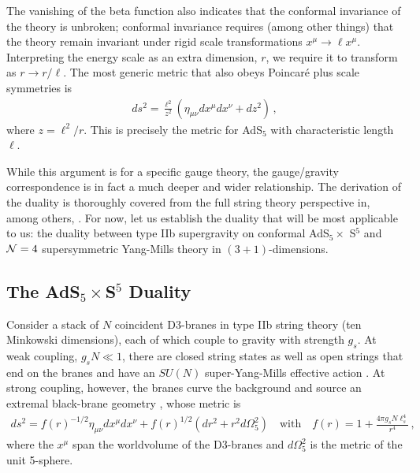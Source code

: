 \documentclass[../PhD.tex]{subfiles}
\begin{document}
The vanishing of the beta function also indicates that the conformal invariance of the theory is unbroken; conformal invariance requires (among other things) that the theory remain invariant under rigid scale transformations $x^\mu \to \ell x^\mu$. Interpreting the energy scale as an extra dimension, $r$, we require it to transform as $r \to r/ \ell$. The most generic metric that also obeys Poincar\'e plus scale symmetries is
\begin{align}
\label{Poincare ads}
ds^2 = \frac{\ell^2}{z^2} \left( \eta_{\mu \nu}dx^\mu dx^\nu +dz^2 \right) \, ,
\end{align}
where $z = \ell^2 / r$. This is precisely the metric for AdS$_5$ with characteristic length $\ell$. 

While this argument is for a specific gauge theory, the gauge/gravity correspondence is in fact a much deeper and wider relationship. The derivation of the duality is thoroughly covered from the full string theory perspective in, among others, \cite{hep-th/9711200, gr-qc/0602037, 1501.00007, hep-th/9902131, hep-th/9905111}. For now, let us establish the duality that will be most applicable to us: the duality between type IIb supergravity on conformal AdS$_5 \times$ S$^5$ and $\mathcal N = 4$ supersymmetric Yang-Mills theory in $(3+1)$-dimensions.


\subsection{The AdS$_5 \times$S$^5$ Duality}
\label{ssec: AdS5xS5}

Consider a stack of $N$ coincident D3-branes in type IIb string theory (ten Minkowski dimensions), each of which couple to gravity with strength $g_s$. At weak coupling, $g_s N \ll 1$, there are closed string states as well as open strings that end on the branes and have an $SU(N)$ super-Yang-Mills effective action \cite{Zwiebach:2004tj}. At strong coupling, however, the branes curve the background and source an extremal black-brane geometry \cite{Horowitz:1991cd}, whose metric is
\begin{align}
\label{bb geom}
ds^2 = f(r)^{-1/2} \eta_{\mu \nu} dx^\mu dx^\nu + f(r)^{1/2} \left(  dr^2 + r^2 d\Omega_5^2 \right)  \quad  \text{with} \quad f(r) = 1 + \frac{4 \pi g_s N \ell_s^4}{r^4} \, ,
\end{align}
where the $x^\mu$ span the worldvolume of the D3-branes and $d\Omega_5^2$ is the metric of the unit 5-sphere.
\end{document}
